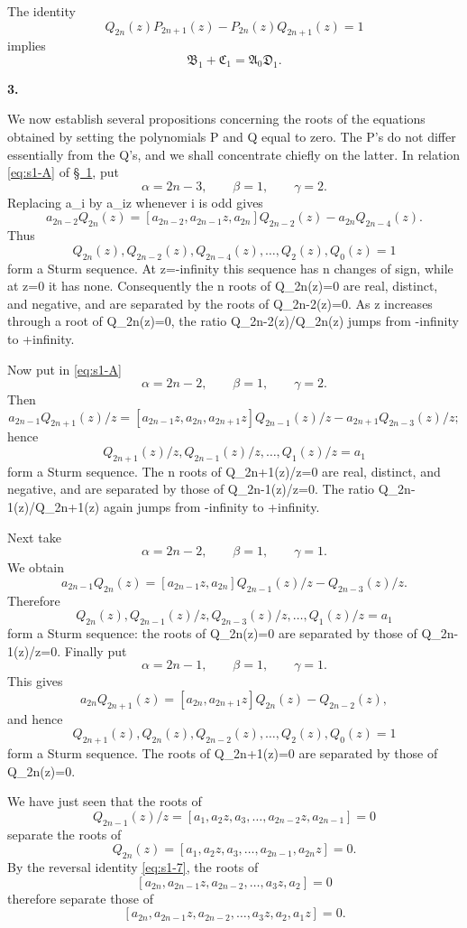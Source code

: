 \documentclass[
  paper=b5,
  fontsize=13pt,
  twoside,
  headings=normal,
  bookmarkpackage=false
]{scrartcl}
\theoremstyle{stieltjesplain}
\theoremstyle{stieltjesdefinition}
\def\({}\def\){}%
\def\frac#1#2{#1/#2}%
\def\infty{infinity}%
\newcommand{\origsection}[1]{%
  \par\addvspace{0.85\baselineskip}%
  \phantomsection\label{sec:#1}%
  \addcontentsline{toc}{subsection}{\texorpdfstring{\S~#1}{Section #1}}%
  \noindent\textbf{#1.}\quad\ignorespaces
}
\begin{document}
The identity
\[
 Q_{2n}(z)P_{2n+1}(z)-P_{2n}(z)Q_{2n+1}(z)=1
\]
implies
\[
 \mathfrak B_1+\mathfrak C_1=\mathfrak A_0\mathfrak D_1.
\]

\origsection{3}
We now establish several propositions concerning the roots of the
equations obtained by setting the polynomials \(P\) and \(Q\) equal to
zero. The \(P\)'s do not differ essentially from the \(Q\)'s, and we shall
concentrate chiefly on the latter. In relation \eqref{eq:s1-A} of
\hyperref[sec:1]{\S~1}, put
\[
 \alpha=2n-3,\qquad\beta=1,\qquad\gamma=2.
\]
Replacing \(a_i\) by \(a_iz\) whenever \(i\) is odd gives
\[
 a_{2n-2}Q_{2n}(z)
 =[a_{2n-2},a_{2n-1}z,a_{2n}]Q_{2n-2}(z)
  -a_{2n}Q_{2n-4}(z).
\]
Thus
\[
 Q_{2n}(z),Q_{2n-2}(z),Q_{2n-4}(z),\ldots,Q_2(z),Q_0(z)=1
\]
form a Sturm sequence. At \(z=-\infty\) this sequence has \(n\) changes
of sign, while at \(z=0\) it has none. Consequently the \(n\) roots of
\(Q_{2n}(z)=0\) are real, distinct, and negative, and are separated by
the roots of \(Q_{2n-2}(z)=0\). As \(z\) increases through a root of
\(Q_{2n}(z)=0\), the ratio \(Q_{2n-2}(z)/Q_{2n}(z)\) jumps from
\(-\infty\) to \(+\infty\).

Now put in \eqref{eq:s1-A}
\[
 \alpha=2n-2,\qquad\beta=1,\qquad\gamma=2.
\]
Then
\[
 a_{2n-1}\frac{Q_{2n+1}(z)}{z}
 =[a_{2n-1}z,a_{2n},a_{2n+1}z]\frac{Q_{2n-1}(z)}{z}
  -a_{2n+1}\frac{Q_{2n-3}(z)}{z};
\]
hence
\[
 \frac{Q_{2n+1}(z)}z,\frac{Q_{2n-1}(z)}z,\ldots,
 \frac{Q_1(z)}z=a_1
\]
form a Sturm sequence. The \(n\) roots of
\(Q_{2n+1}(z)/z=0\) are real, distinct, and negative, and are separated
by those of \(Q_{2n-1}(z)/z=0\). The ratio
\(Q_{2n-1}(z)/Q_{2n+1}(z)\) again jumps from \(-\infty\) to
\(+\infty\).

Next take
\[
 \alpha=2n-2,\qquad\beta=1,\qquad\gamma=1.
\]
We obtain
\[
 a_{2n-1}Q_{2n}(z)
 =[a_{2n-1}z,a_{2n}]\frac{Q_{2n-1}(z)}z
  -\frac{Q_{2n-3}(z)}z.
\]
Therefore
\[
 Q_{2n}(z),\frac{Q_{2n-1}(z)}z,\frac{Q_{2n-3}(z)}z,
 \ldots,\frac{Q_1(z)}z=a_1
\]
form a Sturm sequence: the roots of \(Q_{2n}(z)=0\) are separated by
those of \(Q_{2n-1}(z)/z=0\). Finally put
\[
 \alpha=2n-1,\qquad\beta=1,\qquad\gamma=1.
\]
This gives
\[
 a_{2n}Q_{2n+1}(z)
 =[a_{2n},a_{2n+1}z]Q_{2n}(z)-Q_{2n-2}(z),
\]
and hence
\[
 Q_{2n+1}(z),Q_{2n}(z),Q_{2n-2}(z),\ldots,Q_2(z),Q_0(z)=1
\]
form a Sturm sequence. The roots of \(Q_{2n+1}(z)=0\) are separated by
those of \(Q_{2n}(z)=0\).

We have just seen that the roots of
\[
 \frac{Q_{2n-1}(z)}z
 =[a_1,a_2z,a_3,\ldots,a_{2n-2}z,a_{2n-1}]=0
\]
separate the roots of
\[
 Q_{2n}(z)=[a_1,a_2z,a_3,\ldots,a_{2n-1},a_{2n}z]=0.
\]
By the reversal identity \eqref{eq:s1-7}, the roots of
\[
 [a_{2n},a_{2n-1}z,a_{2n-2},\ldots,a_3z,a_2]=0
\]
therefore separate those of
\[
 [a_{2n},a_{2n-1}z,a_{2n-2},\ldots,a_3z,a_2,a_1z]=0.
\]
\end{document}
